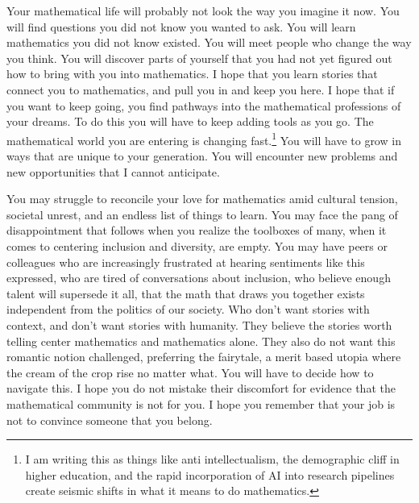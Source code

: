 \documentclass[pdflatex,sn-mathphys-num]{sn-jnl}%
\begin{document}
Your mathematical life will probably not look the way you imagine it now. You will find questions you did not know you wanted to ask. You will learn mathematics you did not know existed. You will meet people who change the way you think. You will discover parts of yourself that you had not yet figured out how to bring with you into mathematics. I hope that you learn stories that connect you to mathematics, and pull you in and keep you here. I hope that if you want to keep going, you find pathways into the mathematical professions of your dreams. To do this you will have to keep adding tools as you go. The mathematical world you are entering is changing fast.\footnote{I am writing this as things like anti intellectualism, the demographic cliff in higher education, and the rapid incorporation of AI into research pipelines create seismic shifts in what it means to do mathematics.} You will have to grow in ways that are unique to your generation. You will encounter new problems and new opportunities that I cannot anticipate.

You may struggle to reconcile your love for mathematics amid cultural tension, societal unrest, and an endless list of things to learn. You may face the pang of disappointment that follows when you realize the toolboxes of many, when it comes to centering inclusion and diversity, are empty. You may have peers or colleagues who are increasingly frustrated at hearing sentiments like this expressed, who are tired of conversations about inclusion, who believe enough talent will supersede it all, that the math that draws you together exists independent from the politics of our society. Who don't want stories with context, and don't want stories with humanity. They believe the stories worth telling center mathematics and mathematics alone. They also do not want this romantic notion challenged, preferring the fairytale, a merit based utopia where the cream of the crop rise no matter what. You will have to decide how to navigate this. I hope you do not mistake their discomfort for evidence that the mathematical community is not for you. I hope you remember that your job is not to convince someone that you belong.
\end{document}
